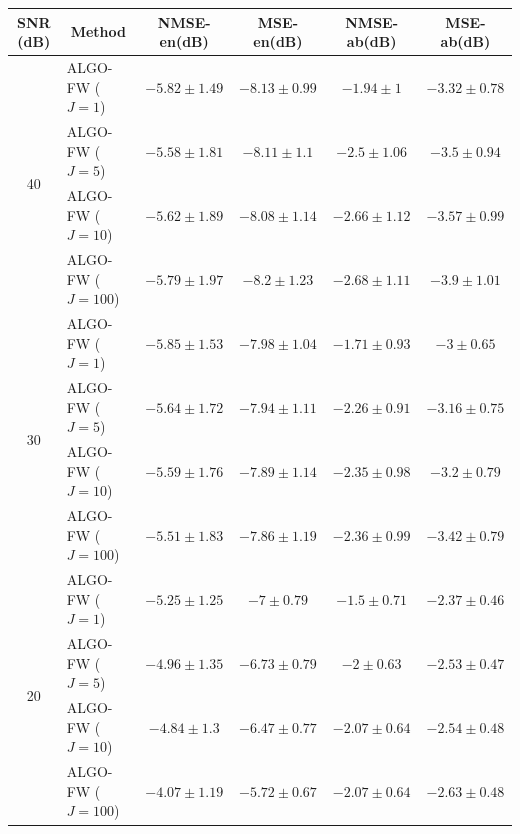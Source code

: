 \begin{table}[h]
\centering
\begin{adjustbox}{max width=\textwidth}
\begin{tabular}{|c|l|c|c|c|c|}
\hline
SNR (dB)            & \multicolumn{1}{c|}{Method}& NMSE-en(dB)         & MSE-en(dB)          & NMSE-ab(dB)         & MSE-ab(dB)          \tabularnewline \hline
\multirow{4}{*}{40} & ALGO-FW ($J=1$)            & $-5.82    \pm 1.49$ & $-8.13    \pm 0.99$ & $-1.94    \pm  1$   & $-3.32    \pm 0.78$ \tabularnewline
                    & ALGO-FW ($J=5$)            & $-5.58    \pm 1.81$ & $-8.11    \pm 1.1$  & $-2.5     \pm 1.06$ & $-3.5     \pm 0.94$ \tabularnewline
                    & ALGO-FW ($J=10$)           & $-5.62    \pm 1.89$ & $-8.08    \pm 1.14$ & $-2.66    \pm 1.12$ & $-3.57    \pm 0.99$ \tabularnewline
                    & ALGO-FW ($J=100$)          & $-5.79    \pm 1.97$ & $-8.2     \pm 1.23$ & $-2.68    \pm 1.11$ & $-3.9     \pm 1.01$ \tabularnewline \hline
\multirow{4}{*}{30} & ALGO-FW ($J=1$)            & $-5.85    \pm 1.53$ & $-7.98    \pm 1.04$ & $-1.71    \pm 0.93$ & $-3       \pm 0.65$ \tabularnewline
                    & ALGO-FW ($J=5$)            & $-5.64    \pm 1.72$ & $-7.94    \pm 1.11$ & $-2.26    \pm 0.91$ & $-3.16    \pm 0.75$ \tabularnewline
                    & ALGO-FW ($J=10$)           & $-5.59    \pm 1.76$ & $-7.89    \pm 1.14$ & $-2.35    \pm 0.98$ & $-3.2     \pm 0.79$ \tabularnewline
                    & ALGO-FW ($J=100$)          & $-5.51    \pm 1.83$ & $-7.86    \pm 1.19$ & $-2.36    \pm 0.99$ & $-3.42    \pm 0.79$ \tabularnewline \hline
\multirow{4}{*}{20} & ALGO-FW ($J=1$)            & $-5.25    \pm 1.25$ & $-7       \pm 0.79$ & $-1.5     \pm 0.71$ & $-2.37    \pm 0.46$ \tabularnewline
                    & ALGO-FW ($J=5$)            & $-4.96    \pm 1.35$ & $-6.73    \pm 0.79$ & $-2       \pm 0.63$ & $-2.53    \pm 0.47$ \tabularnewline
                    & ALGO-FW ($J=10$)           & $-4.84    \pm 1.3$  & $-6.47    \pm 0.77$ & $-2.07    \pm 0.64$ & $-2.54    \pm 0.48$ \tabularnewline
                    & ALGO-FW ($J=100$)          & $-4.07    \pm 1.19$ & $-5.72    \pm 0.67$ & $-2.07    \pm 0.64$ & $-2.63    \pm 0.48$ \tabularnewline \hline

\end{tabular}
\end{adjustbox}
\end{table}
